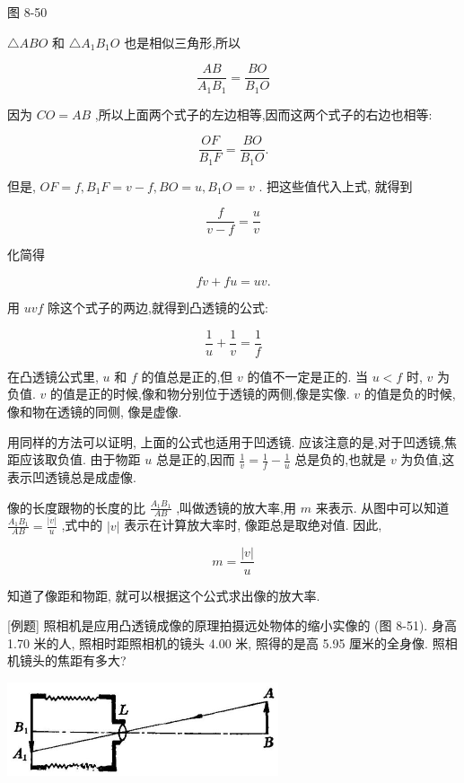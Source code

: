 \documentclass[10pt]{article}
\begin{document}
图 8-50

\(\bigtriangleup {ABO}\) 和 \(\bigtriangleup {A}_{1}{B}_{1}O\) 也是相似三角形,所以

\[
\frac{AB}{{A}_{1}{B}_{1}} = \frac{BO}{{B}_{1}O}
\]

因为 \({CO} = {AB}\) ,所以上面两个式子的左边相等,因而这两个式子的右边也相等:

\[
\frac{OF}{{B}_{1}F} = \frac{BO}{{B}_{1}O}.
\]

但是, \({OF} = f,{B}_{1}F = v - f,{BO} = u,{B}_{1}O = v\) . 把这些值代入上式, 就得到

\[
\frac{f}{v - f} = \frac{u}{v}
\]

化简得

\[
{fv} + {fu} = {uv}.
\]

用 \({uvf}\) 除这个式子的两边,就得到凸透镜的公式:

\[
\frac{1}{u} + \frac{1}{v} = \frac{1}{f}
\]

在凸透镜公式里, \(u\) 和 \(f\) 的值总是正的,但 \(v\) 的值不一定是正的. 当 \(u < f\) 时, \(v\) 为负值. \(v\) 的值是正的时候,像和物分别位于透镜的两侧,像是实像. \(v\) 的值是负的时候,像和物在透镜的同侧, 像是虚像.

用同样的方法可以证明, 上面的公式也适用于凹透镜. 应该注意的是,对于凹透镜,焦距应该取负值. 由于物距 \(u\) 总是正的,因而 \(\frac{1}{v} = \frac{1}{f} - \frac{1}{u}\) 总是负的,也就是 \(v\) 为负值,这表示凹透镜总是成虚像.

像的长度跟物的长度的比 \(\frac{{A}_{1}{B}_{1}}{AB}\) ,叫做透镜的放大率,用 \(m\) 来表示. 从图中可以知道 \(\frac{{A}_{1}{B}_{1}}{AB} = \frac{\left| v\right| }{u}\) ,式中的 \(\left| v\right|\) 表示在计算放大率时, 像距总是取绝对值. 因此,

\[
m = \frac{\left| v\right| }{u}
\]

知道了像距和物距, 就可以根据这个公式求出像的放大率.

[例题] 照相机是应用凸透镜成像的原理拍摄远处物体的缩小实像的 (图 8-51). 身高 1.70 米的人, 照相时距照相机的镜头 4.00 米, 照得的是高 5.95 厘米的全身像. 照相机镜头的焦距有多大?

\begin{center}
\includegraphics[max width=0.6\textwidth]{images/01913056-1f15-74d8-9184-9aab52c9d66b_284_306964.jpg}
\end{center}
\end{document}
